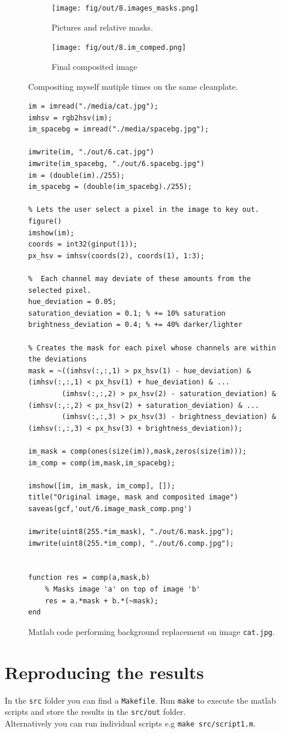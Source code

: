 \documentclass[tikz,14pt,fleqn]{article}
\begin{document}
\begin{figure}[h!]
    \centering
    \begin{subfigure}{1\textwidth}
        \centering
        \texttt{[image: fig/out/8.images\_masks.png]}
        \caption{Pictures and relative masks.}
    \end{subfigure}
    
    \begin{subfigure}{0.33\textwidth}
        \centering
        \texttt{[image: fig/out/8.im\_comped.png]}
        \caption{Final composited image}
    \end{subfigure}

    \caption{Compositing myself mutiple times on the same cleanplate.}
\end{figure}


\begin{figure}[h!]
    \begin{verbatim} 
im = imread("./media/cat.jpg");
imhsv = rgb2hsv(im);
im_spacebg = imread("./media/spacebg.jpg");

imwrite(im, "./out/6.cat.jpg")
imwrite(im_spacebg, "./out/6.spacebg.jpg")
im = (double(im)./255);
im_spacebg = (double(im_spacebg)./255);

% Lets the user select a pixel in the image to key out.
figure()
imshow(im);
coords = int32(ginput(1));
px_hsv = imhsv(coords(2), coords(1), 1:3);

%  Each channel may deviate of these amounts from the selected pixel.
hue_deviation = 0.05;
saturation_deviation = 0.1; % += 10% saturation
brightness_deviation = 0.4; % += 40% darker/lighter

% Creates the mask for each pixel whose channels are within the deviations
mask = ~((imhsv(:,:,1) > px_hsv(1) - hue_deviation) & (imhsv(:,:,1) < px_hsv(1) + hue_deviation) & ...
        (imhsv(:,:,2) > px_hsv(2) - saturation_deviation) & (imhsv(:,:,2) < px_hsv(2) + saturation_deviation) & ...
        (imhsv(:,:,3) > px_hsv(3) - brightness_deviation) & (imhsv(:,:,3) < px_hsv(3) + brightness_deviation));

im_mask = comp(ones(size(im)),mask,zeros(size(im)));
im_comp = comp(im,mask,im_spacebg);

imshow([im, im_mask, im_comp], []);
title("Original image, mask and composited image")
saveas(gcf,'out/6.image_mask_comp.png')

imwrite(uint8(255.*im_mask), "./out/6.mask.jpg");
imwrite(uint8(255.*im_comp), "./out/6.comp.jpg");


function res = comp(a,mask,b)
    % Masks image 'a' on top of image 'b'
    res = a.*mask + b.*(~mask);
end
    \end{verbatim}
\caption{Matlab code performing background replacement on image \texttt{cat.jpg}.}
\end{figure}

\section{Reproducing the results}
In the \verb|src| folder you can find a \verb|Makefile|.
Run \texttt{make} to execute the matlab scripts and store the results in the \verb|src/out| folder.\\
Alternatively you can run individual scripts e.g \texttt{make src/script1.m}.
\end{document}
